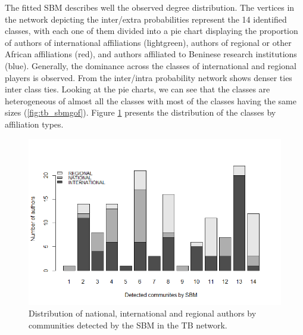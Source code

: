 The fitted SBM describes well the observed degree distribution. The vertices in the network depicting the inter/extra probabilities represent the 14 identified classes, with each one of them divided into a pie chart displaying the proportion of authors of international affiliations (lightgreen), authors of regional or other African affiliations (red), and authors affiliated to Beninese research institutions (blue). Generally, the dominance across the classes of international and regional players is observed. From the inter/intra probability network shows denser ties inter class ties. Looking at the pie charts, we can see that the classes are heterogeneous of almost all the classes with most of the classes having the same sizes (\ref{fig:tb_sbmgof}). Figure \ref{fig:tb_sbmdist} presents the distribution of the classes by affiliation types. \\

\begin{figure}[h!]
\centering
\includegraphics[scale=0.8]{Chapters/tb/statMod/tb_barplot2}
\caption{Distribution of national, international and regional authors by communities detected by the SBM in the TB network.}
\label{fig:tb_sbmdist}
\end{figure}

%

